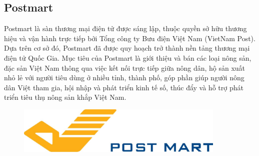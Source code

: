 \subsection{Postmart}
\quad Postmart là sàn thương mại điện tử được sáng lập, thuộc quyền sở hữu thương hiệu và vận hành trực tiếp bởi Tổng công ty Bưu điện Việt Nam (VietNam Post). Dựa trên cơ sở đó, Postmart đã được quy hoạch trở thành nền tảng thương mại điện tử Quốc Gia. Mục tiêu của Postmart là giới thiệu và bán các loại nông sản, đặc sản Việt Nam thông qua việc kết nối trực tiếp giữa nông dân, hộ sản xuất nhỏ lẻ với người tiêu dùng ở nhiều tỉnh, thành phố, góp phần giúp người nông dân Việt tham gia, hội nhập và phát triển kinh tế số, thúc đẩy và hỗ trợ phát triển tiêu thụ nông sản khắp Việt Nam.

\begin{figure}[H]
\begin{center}
\includegraphics[width=10cm]{Images/postmart.jpg}
\end{center}
\end{figure}


